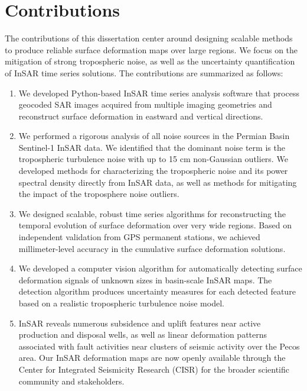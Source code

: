 

\section{Contributions}
\label{sec:chap1-contributions}


The contributions of this dissertation center around designing scalable methods to produce reliable surface deformation maps over large regions. We focus on the mitigation of strong tropospheric noise, as well as the uncertainty quantification of InSAR time series solutions. The contributions are summarized as follows:

\begin{enumerate}
	
	\item We developed Python-based InSAR time series analysis software that process geocoded SAR images acquired from multiple imaging geometries and reconstruct surface deformation in eastward and vertical directions.
	
	\item We performed a rigorous analysis of all noise sources in the Permian Basin Sentinel-1 InSAR data. We identified that the dominant noise term is the tropospheric turbulence noise with up to 15 cm non-Gaussian outliers. We developed methods for characterizing the tropospheric noise and its power spectral density directly from InSAR data, as well as methods for mitigating the impact of the troposphere noise outliers.
	
	\item We designed scalable, robust time series algorithms for reconstructing the temporal evolution of surface deformation over very wide regions. Based on independent validation from GPS permanent stations, we achieved millimeter-level accuracy in the cumulative surface deformation solutions.
	
	\item We developed a computer vision algorithm for automatically detecting surface deformation signals of unknown sizes in basin-scale InSAR maps. The detection algorithm produces uncertainty measures for each detected feature based on a realistic tropospheric turbulence noise model.
	
	\item InSAR reveals numerous subsidence and uplift features near active production and disposal wells, as well as linear deformation patterns associated with fault activities near clusters of seismic activity over the Pecos area. Our InSAR deformation maps are now openly available through the Center for Integrated Seismicity Research (CISR) for the broader scientific community and stakeholders. 
	
	
\end{enumerate}


